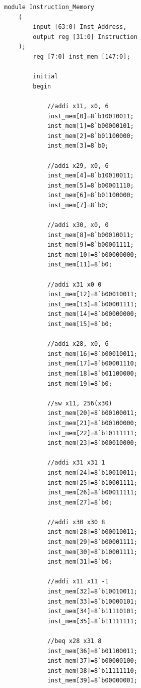 \documentclass{article}
\begin{document}
\begin{lstlisting}[caption={Changes to Instruction Memory}, captionpos=b, language=RISC-V]
    module Instruction_Memory
    (
        input [63:0] Inst_Address,
        output reg [31:0] Instruction
    );
        reg [7:0] inst_mem [147:0];
        
        initial
        begin
        
            //addi x11, x0, 6
            inst_mem[0]=8`b10010011;
            inst_mem[1]=8`b00000101;
            inst_mem[2]=8`b01100000;
            inst_mem[3]=8`b0;
            
            //addi x29, x0, 6
            inst_mem[4]=8`b10010011;
            inst_mem[5]=8`b00001110;
            inst_mem[6]=8`b01100000;
            inst_mem[7]=8`b0;
            
            //addi x30, x0, 0
            inst_mem[8]=8`b00010011;
            inst_mem[9]=8`b00001111;
            inst_mem[10]=8`b00000000;
            inst_mem[11]=8`b0;
            
            //addi x31 x0 0
            inst_mem[12]=8`b00010011;
            inst_mem[13]=8`b00001111;
            inst_mem[14]=8`b00000000;
            inst_mem[15]=8`b0;
            
            //addi x28, x0, 6
            inst_mem[16]=8`b00010011;
            inst_mem[17]=8`b00001110;
            inst_mem[18]=8`b01100000;
            inst_mem[19]=8`b0;
            
            //sw x11, 256(x30)
            inst_mem[20]=8`b00100011;
            inst_mem[21]=8`b00100000;
            inst_mem[22]=8`b10111111;
            inst_mem[23]=8`b00010000;
            
            //addi x31 x31 1
            inst_mem[24]=8`b10010011;
            inst_mem[25]=8`b10001111;
            inst_mem[26]=8`b00011111;
            inst_mem[27]=8`b0;
            
            //addi x30 x30 8
            inst_mem[28]=8`b00010011;
            inst_mem[29]=8`b00001111;
            inst_mem[30]=8`b10001111;
            inst_mem[31]=8`b0;
            
            //addi x11 x11 -1
            inst_mem[32]=8`b10010011;
            inst_mem[33]=8`b10000101;
            inst_mem[34]=8`b11110101;
            inst_mem[35]=8`b11111111;
           
            //beq x28 x31 8
            inst_mem[36]=8`b01100011;
            inst_mem[37]=8`b00000100;
            inst_mem[38]=8`b11111110;
            inst_mem[39]=8`b00000001;
    

\end{lstlisting}
\end{document}
